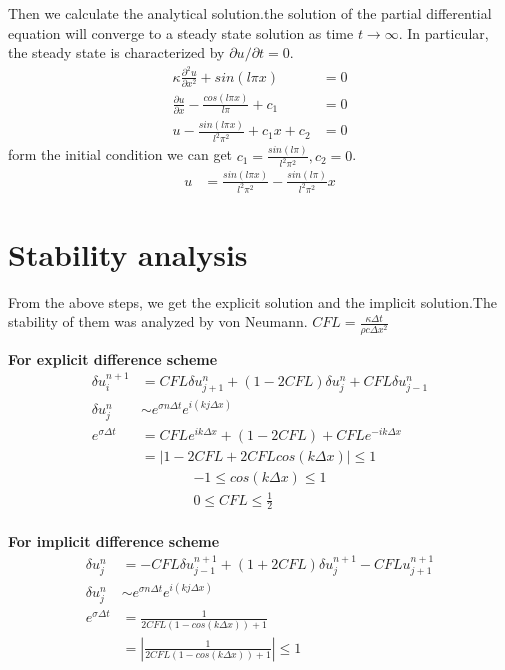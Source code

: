 \documentclass[a4paper]{article}
\begin{document}
        Then we calculate the analytical solution.the solution of the partial differential equation will converge to a steady state solution as time $t \rightarrow \infty$. In particular, the steady state is characterized by $\partial u / \partial t = 0$. 
        \begin{align*}
            \kappa  \frac{\partial^2 u}{\partial x^2} + sin(l\pi x) &= 0 \\
            \frac{\partial u}{\partial x} - \frac{cos(l \pi x)}{l \pi} + c_1 &= 0 \\
            u - \frac{sin(l \pi x)}{l^2\pi^2} + c_1x + c_2 &= 0
        \end{align*}
        form the initial condition we can get $c_1 = \frac{sin(l \pi)}{l^2 \pi^2}, c_2 = 0 $.
        \begin{align*}
            u &= \frac{sin(l \pi x)}{l^2\pi^2} - \frac{sin(l \pi)}{l^2 \pi^2}x
        \end{align*}
    \section{Stability analysis}    
        From the above steps, we get the explicit solution and the implicit solution.The stability of them was analyzed by von Neumann.
        $CFL = \frac{\kappa \Delta t}{\rho c \Delta x^2}$

        \textbf{For explicit difference scheme}
        \begin{align*}
            \delta u^{n+1}_i &= CFL \delta u^n_{j+1} + (1-2CFL)\delta u^n_j + CFL \delta u^n_{j-1} \\
            \delta u^n_j &\sim e^{\sigma n \Delta t}e^{i(kj\Delta x)} \\
            e^{\sigma \Delta t} &= CFLe^{ik\Delta x} + (1-2CFL) + CFLe^{-ik\Delta x} \\
            &= |1 - 2CFL + 2CFL cos(k\Delta x)| \leq 1 
        \end{align*}  
        \begin{align*}
            -1 \leq cos(k\Delta x) \leq 1 \\
            0 \leq CFL \leq \frac{1}{2} \\  
        \end{align*}  

        \textbf{For implicit difference scheme}
        \begin{align*}
           \delta u^n_j &= -CFL\delta u^{n+1}_{j-1} + (1+2CFL)\delta u^{n+1}_j -CFL u^{n+1}_{j+1} \\
           \delta u^n_j &\sim e^{\sigma n \Delta t}e^{i(kj\Delta x)} \\
           e^{\sigma \Delta t} &= \frac{1}{2CFL(1-cos(k\Delta x))+1} \\
           &= |\frac{1}{2CFL(1-cos(k\Delta x))+1}| \leq 1 
        \end{align*} 
        
\end{document}
